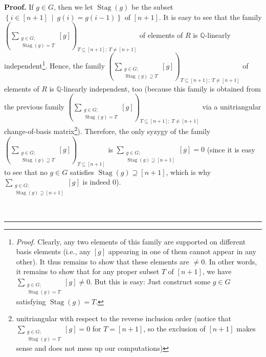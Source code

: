 \documentclass[numbers=enddot,12pt,final,onecolumn,notitlepage]{scrartcl}%
\theoremstyle{definition}
\newenvironment{proof}[1][Proof]{\noindent\textbf{#1.} }{\ \rule{0.5em}{0.5em}}
\let\sumnonlimits\sum
\renewcommand{\sum}{\sumnonlimits\limits}
\begin{document}
\begin{proof}
If $g\in G$, then we let $\operatorname*{Stag}\left(  g\right)  $ be the
subset $\left\{  i\in\left[  n+1\right]  \ \mid\ g\left(  i\right)  =g\left(
i-1\right)  \right\}  $ of $\left[  n+1\right]  $. It is easy to see that the
family $\left(  \sum_{\substack{g\in G;\\\operatorname*{Stag}\left(  g\right)
=T}}\left[  g\right]  \right)  _{T\subseteq\left[  n+1\right]  ;\ T\neq\left[
n+1\right]  }$ of elements of $R$ is $\mathbb{Q}$-linearly
independent\footnote{\textit{Proof.} Clearly, any two elements of this family
are supported on different basis elements (i.e., any $\left[  g\right]  $
appearing in one of them cannot appear in any other). It thus remains to show
that these elements are $\neq0$. In other words, it remains to show that for
any proper subset $T$ of $\left[  n+1\right]  $, we have $\sum_{\substack{g\in
G;\\\operatorname*{Stag}\left(  g\right)  =T}}\left[  g\right]  \neq0$. But
this is easy: Just construct some $g\in G$ satisfying $\operatorname*{Stag}%
\left(  g\right)  =T$.}. Hence, the family $\left(  \sum_{\substack{g\in
G;\\\operatorname*{Stag}\left(  g\right)  \supseteq T}}\left[  g\right]
\right)  _{T\subseteq\left[  n+1\right]  ;\ T\neq\left[  n+1\right]  }$ of
elements of $R$ is $\mathbb{Q}$-linearly independent, too (because this family
is obtained from the previous family $\left(  \sum_{\substack{g\in
G;\\\operatorname*{Stag}\left(  g\right)  =T}}\left[  g\right]  \right)
_{T\subseteq\left[  n+1\right]  ;\ T\neq\left[  n+1\right]  }$ via a
unitriangular change-of-basis matrix\footnote{unitriangular with respect to
the reverse inclusion order (notice that $\sum_{\substack{g\in
G;\\\operatorname*{Stag}\left(  g\right)  =T}}\left[  g\right]  =0$ for
$T=\left[  n+1\right]  $, so the exclusion of $\left[  n+1\right]  $ makes
sense and does not mess up our computations)}). Therefore, the only syzygy of
the family \newline$\left(  \sum_{\substack{g\in G;\\\operatorname*{Stag}%
\left(  g\right)  \supseteq T}}\left[  g\right]  \right)  _{T\subseteq\left[
n+1\right]  }$ is $\sum_{\substack{g\in G;\\\operatorname*{Stag}\left(
g\right)  \supseteq\left[  n+1\right]  }}\left[  g\right]  =0$ (since it is
easy to see that no $g\in G$ satisfies $\operatorname*{Stag}\left(  g\right)
\supseteq\left[  n+1\right]  $, which is why $\sum_{\substack{g\in
G;\\\operatorname*{Stag}\left(  g\right)  \supseteq\left[  n+1\right]
}}\left[  g\right]  $ is indeed $0$).


\end{proof}
\end{document}
